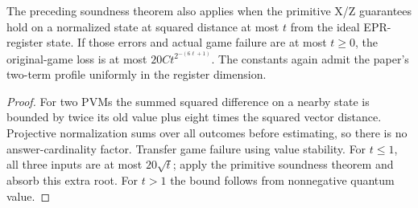 \begin{lemma}
\label{lem:intro-extracted-state-soundness}
\leanok
The preceding soundness theorem also applies when the primitive X/Z
guarantees hold on a normalized state at squared distance at most $t$ from
the ideal EPR-register state. If those errors and actual game failure are
at most $t\geq0$, the original-game loss is at most
$20C t^{2^{-(6\ell+1)}}$. The constants again admit the paper's two-term
profile uniformly in the register dimension.
\end{lemma}
\begin{proof}
\leanok
For two PVMs the summed squared difference on a nearby state is bounded
by twice its old value plus eight times the squared vector distance.
Projective normalization sums over all outcomes before estimating, so
there is no answer-cardinality factor. Transfer game failure using value
stability. For $t\leq1$, all three inputs are at most $20\sqrt t$;
apply the primitive soundness theorem and absorb this extra root.
For $t>1$ the bound follows from nonnegative quantum value.
\end{proof}


